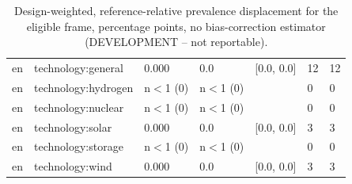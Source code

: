 \begin{table}[htbp]
\begin{tabular}{lllllll}
en & technology:general & 0.000 & 0.0 & [0.0, 0.0] & 12 & 12 \\
en & technology:hydrogen & n$<$1 (0) & n$<$1 (0) &  & 0 & 0 \\
en & technology:nuclear & n$<$1 (0) & n$<$1 (0) &  & 0 & 0 \\
en & technology:solar & 0.000 & 0.0 & [0.0, 0.0] & 3 & 3 \\
en & technology:storage & n$<$1 (0) & n$<$1 (0) &  & 0 & 0 \\
en & technology:wind & 0.000 & 0.0 & [0.0, 0.0] & 3 & 3 \\
\bottomrule
\end{tabular}
\caption{Design-weighted, reference-relative prevalence displacement for the eligible frame, percentage points, no bias-correction estimator (DEVELOPMENT -- not reportable).}
\end{table}
